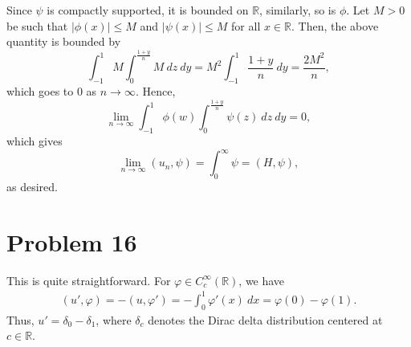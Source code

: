 \documentclass[10pt]{amsart}
\theoremstyle{thmstyle}
\theoremstyle{defstyle}
\newcommand{\R}{\mathbb{R}}
\renewcommand{\le}{\leqslant}
\begin{document}
Since $\psi$ is compactly supported, it is bounded on $\R$, similarly, so is $\phi$. Let $M > 0$ be such that $|\phi(x)|\le M$ and $|\psi(x)|\le M$ for all $x\in\R$. Then, the above quantity is bounded by 
\begin{equation*}
	\int_{-1}^1M\int_{0}^{\frac{1 + y}{n}} M~dz~dy = M^2\int_{-1}^{1}\frac{1 + y}{n}~dy = \frac{2M^2}{n},
\end{equation*}
which goes to $0$ as $n\to\infty$. Hence, 
\begin{equation*}
	\lim_{n\to\infty} \int_{-1}^1\phi(w)\int_{0}^{\frac{1 + y}{n}}\psi(z)~dz~dy = 0,
\end{equation*}
which gives 
\begin{equation*}
	\lim_{n\to\infty} (u_n,\psi) = \int_{0}^\infty \psi = (H,\psi),
\end{equation*}
as desired.

\section{Problem 16}
This is quite straightforward. For $\varphi\in C_c^\infty(\R)$, we have 
\begin{align*}
	(u',\varphi) = -(u,\varphi') = -\int_0^1\varphi'(x)~dx = \varphi(0) - \varphi(1).
\end{align*}
Thus, $u' = \delta_0 - \delta_1$, where $\delta_c$ denotes the Dirac delta distribution centered at $c\in\R$.
 


\end{document}
